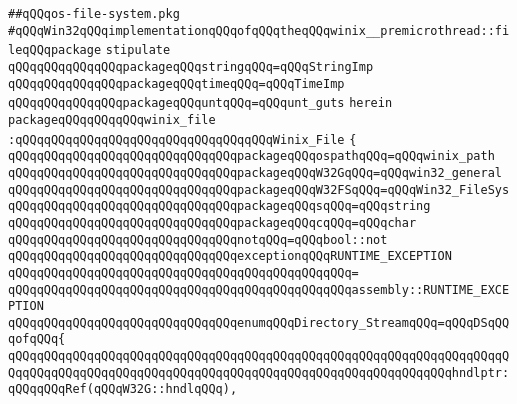 \label{src/lib/std/src/win32/os-file-system.pkg}
\verb|##qQQqos-file-system.pkg|\newline
\newline
\newline
\newline
\verb|#qQQqWin32qQQqimplementationqQQqofqQQqtheqQQqwinix__premicrothread::fileqQQqpackage|\newline
\newline
\newline
\newline
\verb|stipulate|\newline
\verb|qQQqqQQqqQQqqQQqpackageqQQqstringqQQq=qQQqStringImp|\newline
\verb|qQQqqQQqqQQqqQQqpackageqQQqtimeqQQq=qQQqTimeImp|\newline
\verb|qQQqqQQqqQQqqQQqpackageqQQquntqQQq=qQQqunt_guts|\newline
\verb|herein|\newline
\verb|packageqQQqqQQqqQQqwinix_file|\newline
\verb|:qQQqqQQqqQQqqQQqqQQqqQQqqQQqqQQqqQQqWinix_File|\newline
\verb|{|\newline
\verb|qQQqqQQqqQQqqQQqqQQqqQQqqQQqqQQqpackageqQQqospathqQQq=qQQqwinix_path|\newline
\verb|qQQqqQQqqQQqqQQqqQQqqQQqqQQqqQQqpackageqQQqW32GqQQq=qQQqwin32_general|\newline
\verb|qQQqqQQqqQQqqQQqqQQqqQQqqQQqqQQqpackageqQQqW32FSqQQq=qQQqWin32_FileSys|\newline
\verb|qQQqqQQqqQQqqQQqqQQqqQQqqQQqqQQqpackageqQQqsqQQq=qQQqstring|\newline
\verb|qQQqqQQqqQQqqQQqqQQqqQQqqQQqqQQqpackageqQQqcqQQq=qQQqchar|\newline
\verb|qQQqqQQqqQQqqQQqqQQqqQQqqQQqqQQqnotqQQq=qQQqbool::not|\newline
\newline
\verb|qQQqqQQqqQQqqQQqqQQqqQQqqQQqqQQqexceptionqQQqRUNTIME_EXCEPTION|\newline
\verb|qQQqqQQqqQQqqQQqqQQqqQQqqQQqqQQqqQQqqQQqqQQqqQQq=|\newline
\verb|qQQqqQQqqQQqqQQqqQQqqQQqqQQqqQQqqQQqqQQqqQQqqQQqassembly::RUNTIME_EXCEPTION|\newline
\newline
\verb|qQQqqQQqqQQqqQQqqQQqqQQqqQQqqQQqenumqQQqDirectory_StreamqQQq=qQQqDSqQQqofqQQq{|\newline
\verb|qQQqqQQqqQQqqQQqqQQqqQQqqQQqqQQqqQQqqQQqqQQqqQQqqQQqqQQqqQQqqQQqqQQqqQQqqQQqqQQqqQQqqQQqqQQqqQQqqQQqqQQqqQQqqQQqqQQqqQQqqQQqqQQqqQQqhndlptr:qQQqqQQqRef(qQQqW32G::hndlqQQq),|\newline
